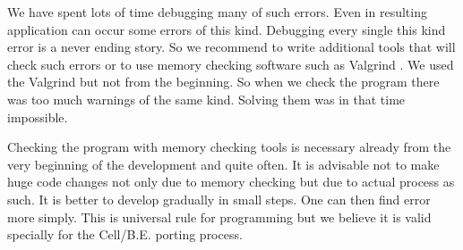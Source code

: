 \par
We have spent lots of time debugging many of such errors.
Even in resulting application can occur some errors of this kind.
Debugging every single this kind error is a never ending story.
So we recommend to write additional tools that will check such errors or to use memory checking software such as Valgrind \cite{valgrind}.
We used the Valgrind but not from the beginning.
So when we check the program there was too much warnings of the same kind.
Solving them was in that time impossible.

\par
Checking the program with memory checking tools is necessary already from the very beginning of the development and quite often.
It is advisable not to make huge code changes not only due to memory checking but due to actual process as such.
It is better to develop gradually in small steps.
One can then find error more simply.
This is universal rule for programming but we believe it is valid specially for the \mbox{Cell/B.E.} porting process.
